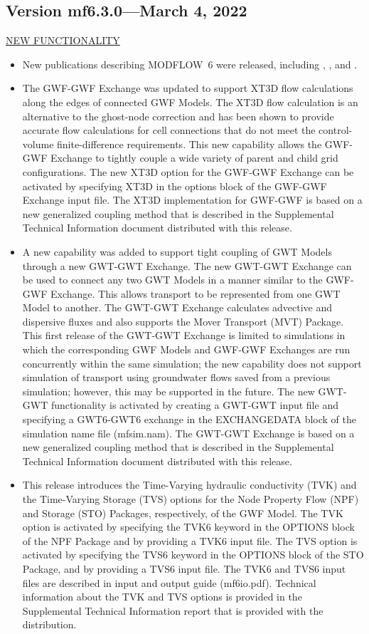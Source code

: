 	\subsection{Version mf6.3.0---March 4, 2022}
	
	\underline{NEW FUNCTIONALITY}
	\begin{itemize}
		\item New publications describing MODFLOW~6 were released, including \cite{modflow6api}, \cite{modflow6gwt}, and \cite{modflow6csub}. 
	        \item The GWF-GWF Exchange was updated to support XT3D flow calculations along the edges of connected GWF Models.  The XT3D flow calculation is an alternative to the ghost-node correction and has been shown to provide accurate flow calculations for cell connections that do not meet the control-volume finite-difference requirements.  This new capability allows the GWF-GWF Exchange to tightly couple a wide variety of parent and child grid configurations.  The new XT3D option for the GWF-GWF Exchange can be activated by specifying XT3D in the options block of the GWF-GWF Exchange input file.  The XT3D implementation for GWF-GWF is based on a new generalized coupling method that is described in the Supplemental Technical Information document distributed with this release.
	        \item A new capability was added to support tight coupling of GWT Models through a new GWT-GWT Exchange.  The new GWT-GWT Exchange can be used to connect any two GWT Models in a manner similar to the GWF-GWF Exchange.  This allows transport to be represented from one GWT Model to another.  The GWT-GWT Exchange calculates advective and dispersive fluxes and also supports the Mover Transport (MVT) Package.  This first release of the GWT-GWT Exchange is limited to simulations in which the corresponding GWF Models and GWF-GWF Exchanges are run concurrently within the same simulation; the new capability does not support simulation of transport using groundwater flows saved from a previous simulation; however, this may be supported in the future.  The new GWT-GWT functionality is activated by creating a GWT-GWT input file and specifying a GWT6-GWT6 exchange in the EXCHANGEDATA block of the simulation name file (mfsim.nam).  The GWT-GWT Exchange is based on a new generalized coupling method that is described in the Supplemental Technical Information document distributed with this release.
	        \item This release introduces the Time-Varying hydraulic conductivity (TVK) and the Time-Varying Storage (TVS) options for the Node Property Flow (NPF) and Storage (STO) Packages, respectively, of the GWF Model.  The TVK option is activated by specifying the TVK6 keyword in the OPTIONS block of the NPF Package and by providing a TVK6 input file.  The TVS option is activated by specifying the TVS6 keyword in the OPTIONS block of the STO Package, and by providing a TVS6 input file.  The TVK6 and TVS6 input files are described in input and output guide (mf6io.pdf).  Technical information about the TVK and TVS options is provided in the Supplemental Technical Information report that is provided with the distribution.

\end{itemize}
